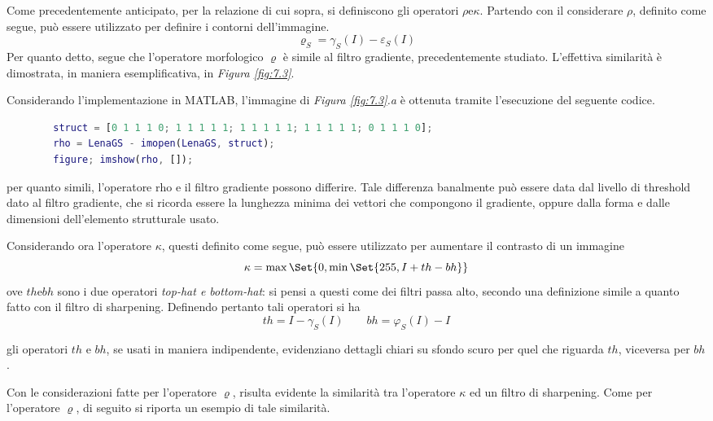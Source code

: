 \documentclass{subfiles}
\begin{document}
Come precedentemente anticipato, per la relazione di cui sopra, si definiscono gli operatori \(\rho \text{e} \kappa\).
Partendo con il considerare \(\rho\), definito come segue, può essere utilizzato per definire i contorni dell'immagine.
\[
    \varrho_{S} = \gamma_{S}(I) - \varepsilon_{S}(I)
\]
Per quanto detto, segue che l'operatore morfologico \(\varrho\) è simile al filtro gradiente, precedentemente studiato.
L'effettiva similarità è dimostrata, in maniera esemplificativa, in \emph{Figura \ref{fig:7.3}}.


Considerando l'implementazione in MATLAB, l'immagine di \emph{Figura \ref{fig:7.3}.a} è ottenuta tramite l'esecuzione del seguente codice.
\begin{center}
    \begin{lstlisting}[language = MATLAB]
        % caricamento di LenaGS
        struct = [0 1 1 1 0; 1 1 1 1 1; 1 1 1 1 1; 1 1 1 1 1; 0 1 1 1 0];
        rho = LenaGS - imopen(LenaGS, struct);
        figure; imshow(rho, []);
    \end{lstlisting}
\end{center}

\begin{Remark*}
    per quanto simili, l'operatore rho e il filtro gradiente possono differire. Tale differenza banalmente può essere data dal livello di threshold dato al filtro gradiente,
    che si ricorda essere la lunghezza minima dei vettori che compongono il gradiente, oppure dalla forma e dalle dimensioni dell'elemento strutturale usato.
\end{Remark*}

Considerando ora l'operatore \(\kappa\), questi definito come segue, può essere utilizzato per aumentare il contrasto di un immagine
\[
    \kappa = \max\Set{0, \min\Set{255, I + th - bh}}
\]
ove \(th \text{e} bh\) sono i due operatori \emph{top-hat \emph{e} bottom-hat}: si pensi a questi come dei filtri passa alto,
secondo una definizione simile a quanto fatto con il filtro di sharpening. Definendo pertanto tali operatori si ha
\[
    th = I - \gamma_{S}(I) \qquad bh = \varphi_{S}(I) - I
\]
\begin{Note*}
    gli operatori \(th\) e \(bh\), se usati in maniera indipendente, evidenziano dettagli chiari su sfondo scuro per quel che riguarda \(th\),
    viceversa per \(bh\).
\end{Note*}
\clearpage

Con le considerazioni fatte per l'operatore \(\varrho\), risulta evidente la similarità tra l'operatore \(\kappa\) ed un filtro di sharpening.
Come per l'operatore \(\varrho\), di seguito si riporta un esempio di tale similarità.

\end{document}

